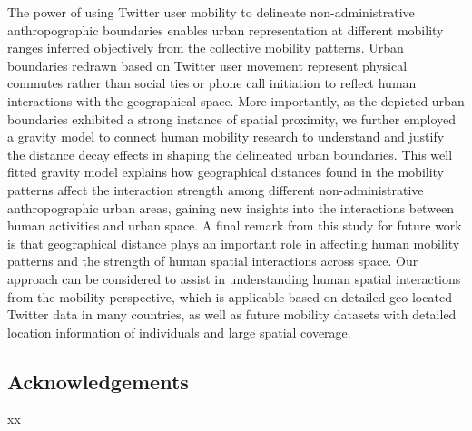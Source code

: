 \documentclass[]{tGIS2e}
\begin{document}
The power of using Twitter user mobility to delineate non-administrative anthropographic boundaries enables urban representation at different mobility ranges inferred objectively from the collective mobility patterns. 
Urban boundaries redrawn based on Twitter user movement represent physical commutes rather than social ties or phone call initiation to reflect human interactions with the geographical space.
More importantly, as the depicted urban boundaries exhibited a strong instance of spatial proximity, we further employed a gravity model to connect human mobility research to understand and justify the distance decay effects in shaping the delineated urban boundaries.
This well fitted gravity model explains how geographical distances found in the mobility patterns affect the interaction strength among different non-administrative anthropographic urban areas, gaining new insights into the interactions between human activities and urban space.
A final remark from this study for future work is that geographical distance plays an important role in affecting human mobility patterns and the strength of human spatial interactions across space.
Our approach can be considered to assist in understanding human spatial interactions from the mobility perspective, which is applicable based on detailed geo-located Twitter data in many countries, as well as future mobility datasets with detailed location information of individuals and large spatial coverage.  

\subsection*{Acknowledgements}
xx
\end{document}
